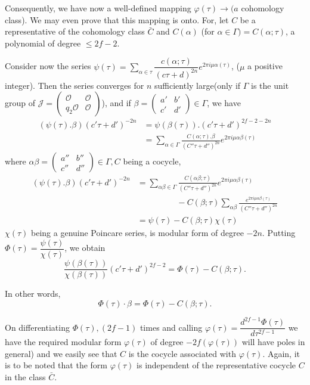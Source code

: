 Consequently, we have now a well-defined mapping $\varphi(\tau)\to (a$
cohomology class). We may even prove that this mapping is onto. For, let
$C$ be a representative of the cohomology class $\bar{C}$ and
$C(\alpha)$ (for $\alpha \in \Gamma)=C(\alpha; \tau)$, a polynomial of
degree $\leq 2f-2$. 

Consider now the series $\psi (\tau)= \sum\limits_{\alpha \in
  \tau}\dfrac{c(\alpha 
  ;\tau)}{(c\tau+d)^{2n}} e^{2 \pi i \mu \alpha (\tau)}$,
($\mu$ a positive integer). Then the series converges for $n$
sufficiently large\pageoriginale (only if $\Gamma$ is the unit group of
$\mathcal{J}= \begin{pmatrix} \mathscr{O}&\mathscr{O}\\q_2\mathscr{O}&
  \mathscr{O} \end{pmatrix}$), and if
$\beta=\begin{pmatrix}a'&b'\\c'&d' \end{pmatrix} \in \Gamma$, we have 
\begin{align*}
  (\psi(\tau).\beta)(c' \tau+d')^{-2n}&= \psi (\beta
  (\tau)). (c'\tau+d')^{2f-2-2n}\\ 
  &= \sum_{\alpha \in \Gamma} \frac{C(\alpha ;\tau).\beta}{(C''\tau
    +d'')^{2n}}e^{2 \pi i\mu \alpha \beta (\tau)} 
\end{align*}
where $\alpha \beta=\begin{pmatrix}a''&b''\\c''&d'' \end{pmatrix} \in
\Gamma, C$ being a cocycle, 
\begin{align*}
  (\psi(\tau).\beta)(c' \tau+d')^{-2n} & = \sum_{\alpha \beta \in
    \Gamma}\frac{C(\alpha \beta;\tau)}{(C''\tau + d'')^{2n}}e^{2 \pi i\mu
    \alpha \beta (\tau)}\\
  & \hspace{2cm}-C(\beta; \tau)\sum_{\alpha
    \beta}\frac{e^{2 \pi i \mu \alpha \beta (\tau)}}{(C''
    \tau+d'')^{2n}}\\ 
  &= \psi(\tau)-C(\beta ;\tau)\chi (\tau)
\end{align*}
$\chi (\tau)$ being a genuine Poincare series, is modular form of
degree $-2n$. Putting $\Phi (\tau)= \dfrac{\psi (\tau)}{\chi (\tau)}$,
we obtain 
$$
\frac{\psi(\beta (\tau))}{\chi (\beta(\tau))} (c' \tau +d')^{2f-2}
=\Phi (\tau)-C(\beta; \tau). 
$$

In other words,
$$
\Phi (\tau) \cdot \beta= \Phi (\tau)-C(\beta; \tau).
$$

On differentiating $\Phi (\tau),(2f-1)$ times and calling $\varphi
(\tau)=\dfrac{d^{2f-1}\Phi (\tau)}{d \tau ^{2f-1}}$ we have the
required modular form $\varphi (\tau)$ of degree $-2f(\varphi (\tau))$
will have poles in general) and we easily see that $C$ is the cocycle
associated with $\varphi(\tau)$. Again, it is to be noted that the
form $\varphi(\tau)$ is independent of the representative cocycle $C$
in the class $\bar{C}$. 

